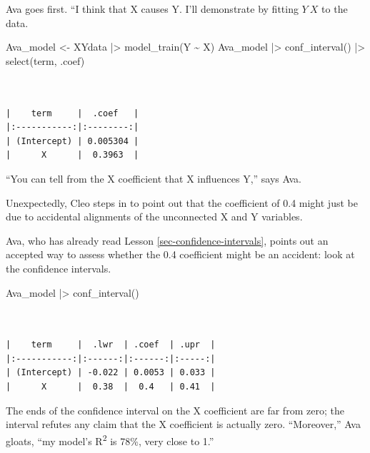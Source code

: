 \documentclass[
  letterpaper,
  DIV=11,
  numbers=noendperiod,
  oneside]{scrartcl}
\newenvironment{Shaded}{\begin{snugshade}}{\end{snugshade}}
\newcommand{\FunctionTok}[1]{\textcolor[rgb]{0.28,0.35,0.67}{#1}}
\newcommand{\NormalTok}[1]{\textcolor[rgb]{0.00,0.23,0.31}{#1}}
\newcommand{\OtherTok}[1]{\textcolor[rgb]{0.00,0.23,0.31}{#1}}
\newcommand{\SpecialCharTok}[1]{\textcolor[rgb]{0.37,0.37,0.37}{#1}}
\begin{document}
Ava goes first. ``I think that X causes Y. I'll demonstrate by fitting
\(Y ~ X\) to the data.

\begin{Shaded}
\begin{Highlighting}[]
\NormalTok{Ava\_model }\OtherTok{\textless{}{-}}\NormalTok{ XYdata }\SpecialCharTok{|\textgreater{}} \FunctionTok{model\_train}\NormalTok{(Y }\SpecialCharTok{\textasciitilde{}}\NormalTok{ X)}
\NormalTok{Ava\_model }\SpecialCharTok{|\textgreater{}} \FunctionTok{conf\_interval}\NormalTok{() }\SpecialCharTok{|\textgreater{}} \FunctionTok{select}\NormalTok{(term, .coef)}
\end{Highlighting}
\end{Shaded}

\begin{verbatim}


|    term     |  .coef   |
|:-----------:|:--------:|
| (Intercept) | 0.005304 |
|      X      |  0.3963  |
\end{verbatim}

``You can tell from the X coefficient that X influences Y,'' says Ava.

Unexpectedly, Cleo steps in to point out that the coefficient of 0.4
might just be due to accidental alignments of the unconnected X and Y
variables.

Ava, who has already read Lesson \ref{sec-confidence-intervals}, points
out an accepted way to assess whether the 0.4 coefficient might be an
accident: look at the confidence intervals.

\begin{Shaded}
\begin{Highlighting}[]
\NormalTok{Ava\_model }\SpecialCharTok{|\textgreater{}} \FunctionTok{conf\_interval}\NormalTok{()}
\end{Highlighting}
\end{Shaded}

\begin{verbatim}


|    term     |  .lwr  | .coef  | .upr  |
|:-----------:|:------:|:------:|:-----:|
| (Intercept) | -0.022 | 0.0053 | 0.033 |
|      X      |  0.38  |  0.4   | 0.41  |
\end{verbatim}

{} The ends of the confidence interval on the
X coefficient are far from zero; the interval refutes any claim that the
X coefficient is actually zero. ``Moreover,'' Ava gloats, ``my model's
R\textsuperscript{2} is 78\%, very close to 1.''
\end{document}
